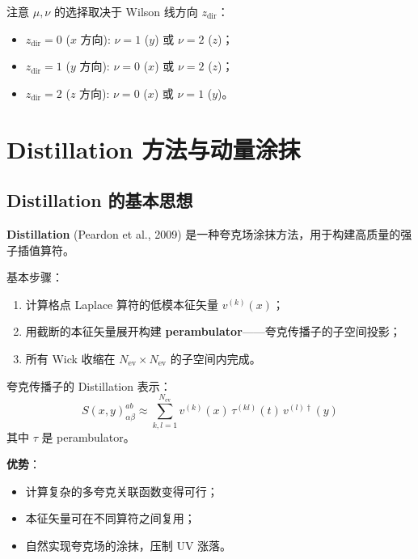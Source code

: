 \documentclass[11pt,a4paper]{ctexart}
\begin{document}
注意 $\mu, \nu$ 的选择取决于 Wilson 线方向 $z_{\text{dir}}$：
\begin{itemize}
  \item $z_{\text{dir}} = 0$ ($x$ 方向): $\nu = 1$ ($y$) 或 $\nu = 2$ ($z$)；
  \item $z_{\text{dir}} = 1$ ($y$ 方向): $\nu = 0$ ($x$) 或 $\nu = 2$ ($z$)；
  \item $z_{\text{dir}} = 2$ ($z$ 方向): $\nu = 0$ ($x$) 或 $\nu = 1$ ($y$)。
\end{itemize}

\section{Distillation 方法与动量涂抹}

\subsection{Distillation 的基本思想}

\textbf{Distillation} (Peardon et al., 2009) 是一种夸克场涂抹方法，用于构建高质量的强子插值算符。

基本步骤：
\begin{enumerate}
  \item 计算格点 Laplace 算符的低模本征矢量 $v^{(k)}(x)$；
  \item 用截断的本征矢量展开构建 \textbf{perambulator}——夸克传播子的子空间投影；
  \item 所有 Wick 收缩在 $N_{\text{ev}} \times N_{\text{ev}}$ 的子空间内完成。
\end{enumerate}

夸克传播子的 Distillation 表示：
\begin{equation}\label{eq:distillation}
S(x, y)_{\alpha\beta}^{ab} \approx \sum_{k,l=1}^{N_{\text{ev}}}
v^{(k)}(x) \, \tau^{(kl)}(t) \, v^{(l)\dagger}(y)
\end{equation}
其中 $\tau$ 是 perambulator。

\textbf{优势}：
\begin{itemize}
  \item 计算复杂的多夸克关联函数变得可行；
  \item 本征矢量可在不同算符之间复用；
  \item 自然实现夸克场的涂抹，压制 UV 涨落。
\end{itemize}
\end{document}

